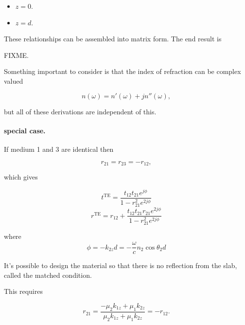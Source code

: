 \begin{itemize}
   \item \( z = 0 \).
   \item \( z = d \).
\end{itemize}
These relationships can be assembled into matrix form. The end result is

FIXME.

Something important to consider is that the index of refraction can be complex valued

\begin{dmath}\label{eqn:emtLecture10:240}
n(\omega) = n'(\omega) + j n''(\omega),
\end{dmath}

but all of these derivations are independent of this.

\paragraph{special case.}

If medium 1 and 3 are identical then

\begin{dmath}\label{eqn:emtLecture10:260}
r_{21} = r_{23} = -r_{12},
\end{dmath}

which gives

\begin{dmath}\label{eqn:emtLecture10:280}
   t^{\textrm{TE}} = \frac{t_{12} t_{21} e^{j \phi}}{1 - r_{21}^2 e^{2 j \phi}}
\end{dmath}
\begin{dmath}\label{eqn:emtLecture10:300}
   r^{\textrm{TE}} = r_{12} + \frac{t_{12} t_{21} r_{21} e^{2 j \phi}}{1 - r_{21}^2 e^{2 j \phi}}
\end{dmath}

where
\begin{dmath}\label{eqn:emtLecture10:320}
   \phi = -k_{2z} d = - \frac{\omega}{c} n_2 \cos\theta_2 d
\end{dmath}

It's possible to design the material so that there is no reflection from the slab, called the matched condition.

This requires

\begin{dmath}\label{eqn:emtLecture10:340}
r_{21} = \frac{-\mu_2 k_{1z} + \mu_1 k_{2z}}{\mu_2 k_{1z} + \mu_1 k_{2z}} = -r_{12}.
\end{dmath}

